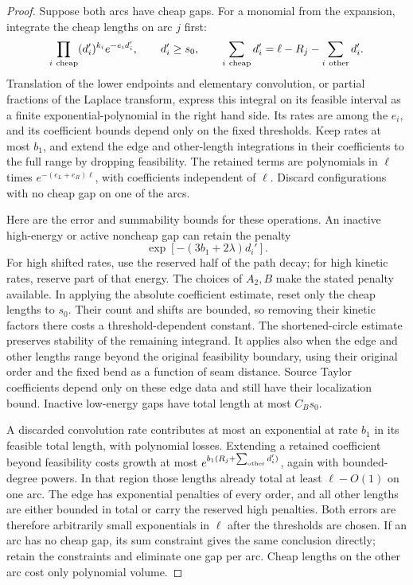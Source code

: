 \documentclass[11pt]{article}
\numberwithin{equation}{section}
\theoremstyle{definition}\newtheorem{definition}[theorem]{Definition}
\theoremstyle{remark}\newtheorem{remark}[theorem]{Remark}
\begin{document}
\begin{proof}
Suppose both arcs have cheap gaps. For a monomial from the expansion,
integrate the cheap lengths on arc \(j\) first:
\[
 \prod_{i\ {\rm cheap}}(d_i')^{k_i}e^{-e_i d_i'},\qquad
 d_i'\ge s_0,\qquad
 \sum_{i\ {\rm cheap}}d_i'
       =\ell-R_j-\sum_{i\ {\rm other}}d_i'.
\]
Translation of the lower endpoints and elementary convolution, or
partial fractions of the Laplace transform, express this integral on
its feasible interval as a finite exponential-polynomial in the right
hand side. Its rates are among the \(e_i\), and its coefficient bounds
depend only on the fixed thresholds. Keep rates at most \(b_1\), and
extend the edge and other-length integrations in their coefficients to
the full range by dropping feasibility. The retained terms are
polynomials in \(\ell\) times
\(e^{-(e_L+e_R)\ell}\), with coefficients independent of \(\ell\).
Discard configurations with no cheap gap on one of the arcs.

Here are the error and summability bounds for these operations. An
inactive high-energy or active noncheap gap can retain the penalty
\[
 \exp[-(3b_1+2\lambda)d_i'].
\]
For high shifted rates, use the reserved half of the path decay; for
high kinetic rates, reserve part of that energy. The choices of
\(A_2,B\) make the stated penalty available. In applying the absolute
coefficient estimate, reset only the cheap lengths to \(s_0\).
Their count and shifts are bounded, so removing their kinetic factors
there costs a threshold-dependent constant. The shortened-circle
estimate preserves stability of the remaining integrand. It applies
also when the edge and other lengths range beyond the original
feasibility boundary, using their original order and the fixed bend
as a function of seam distance. Source Taylor coefficients depend
only on these edge data and still have their localization bound.
Inactive low-energy gaps have total length at most \(C_Bs_0\).

A discarded convolution rate contributes at most an exponential at
rate \(b_1\) in its feasible total length, with polynomial losses.
Extending a retained coefficient beyond feasibility costs growth at
most \(e^{b_1(R_j+\sum_{\rm other}d_i')}\), again with bounded-degree
powers. In that region those lengths already total at least
\(\ell-O(1)\) on one arc. The edge has exponential penalties of every
order, and all other lengths are either bounded in total or carry the
reserved high penalties. Both errors are therefore arbitrarily small
exponentials in \(\ell\) after the thresholds are chosen. If an arc has
no cheap gap, its sum constraint gives the same conclusion directly;
retain the constraints and eliminate one gap per arc. Cheap lengths on
the other arc cost only polynomial volume.


\end{proof}
\end{document}
